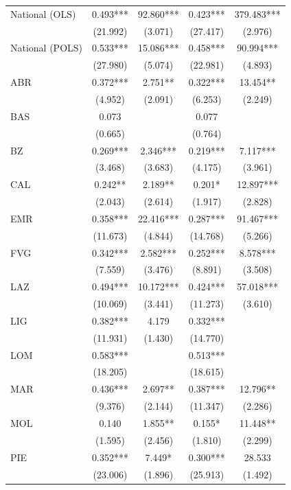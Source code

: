 \documentclass[12pt]{article}
\begin{document}
\begin{longtable}{@{}lcccc@{}}
        National (OLS) & 0.493*** & 92.860*** & 0.423*** & 379.483*** \\ 
         & (21.992) & (3.071) & (27.417) & (2.976) \\ 
        National (POLS) & 0.533*** & 15.086*** & 0.458*** & 90.994*** \\ 
         & (27.980) & (5.074) & (22.981) & (4.893) \\ 
        ABR & 0.372*** & 2.751** & 0.322*** & 13.454** \\ 
         & (4.952) & (2.091) & (6.253) & (2.249) \\ 
        BAS & 0.073 &  & 0.077 &  \\ 
         & (0.665) &  & (0.764) &  \\ 
        BZ & 0.269*** & 2.346*** & 0.219*** & 7.117*** \\ 
         & (3.468) & (3.683) & (4.175) & (3.961) \\ 
        CAL & 0.242** & 2.189** & 0.201* & 12.897*** \\ 
         & (2.043) & (2.614) & (1.917) & (2.828) \\ 
        EMR & 0.358*** & 22.416*** & 0.287*** & 91.467*** \\ 
         & (11.673) & (4.844) & (14.768) & (5.266) \\ 
        FVG & 0.342*** & 2.582*** & 0.252*** & 8.578*** \\ 
         & (7.559) & (3.476) & (8.891) & (3.508) \\ 
        LAZ & 0.494*** & 10.172*** & 0.424*** & 57.018*** \\ 
         & (10.069) & (3.441) & (11.273) & (3.610) \\ 
        LIG & 0.382*** & 4.179 & 0.332*** &  \\ 
         & (11.931) & (1.430) & (14.770) &  \\ 
        LOM & 0.583*** &  & 0.513*** &  \\ 
         & (18.205) &  & (18.615) &  \\ 
        MAR & 0.436*** & 2.697** & 0.387*** & 12.796** \\ 
         & (9.376) & (2.144) & (11.347) & (2.286) \\ 
        MOL & 0.140 & 1.855** & 0.155* & 11.448** \\ 
         & (1.595) & (2.456) & (1.810) & (2.299) \\ 
        PIE & 0.352*** & 7.449* & 0.300*** & 28.533 \\ 
         & (23.006) & (1.896) & (25.913) & (1.492) \\ 

\end{longtable}
\end{document}
